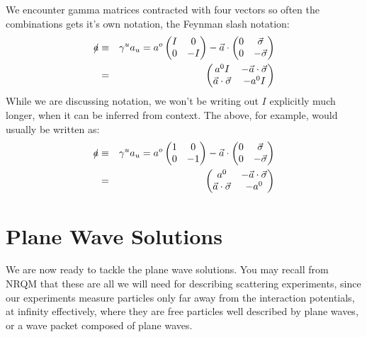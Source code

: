 \documentclass[12pt]{book}
\begin{document}
We encounter gamma matrices contracted with four vectors so often the combinations gets it's own notation, the Feynman slash notation:
\begin{eqnarray*}
\slashed{a} &\equiv& \gamma^u a_u = a^o \begin{pmatrix} I & 0 \\ 0 & -I \end{pmatrix}
- \vec{a} \cdot \begin{pmatrix} 0 & \vec{\sigma} \\ 0 & -\vec{\sigma} \end{pmatrix}\\
&=& \begin{pmatrix} a^0 I & - \vec{a}\cdot\vec{\sigma} \\ \vec{a}\cdot\vec{\sigma} & -a^0 I \end{pmatrix}
\end{eqnarray*}
While we are discussing notation, we won't be writing out $I$ explicitly much longer, when it can be inferred from context.  The above, for example, would usually be written as:
\begin{eqnarray*}
\slashed{a} &\equiv& \gamma^u a_u = a^o \begin{pmatrix} 1 & 0 \\ 0 & -1 \end{pmatrix}
- \vec{a} \cdot \begin{pmatrix} 0 & \vec{\sigma} \\ 0 & -\vec{\sigma} \end{pmatrix}\\
&=& \begin{pmatrix} a^0 & - \vec{a}\cdot\vec{\sigma} \\ \vec{a}\cdot\vec{\sigma} & -a^0 \end{pmatrix}
\end{eqnarray*}

\section{Plane Wave Solutions}

We are now ready to tackle the plane wave solutions.  You may recall from NRQM that these are all we will need for describing scattering experiments, since our experiments measure particles only far away from the interaction potentials, at infinity effectively, where they are free particles well described by plane waves, or a wave packet composed of plane waves.
\end{document}
